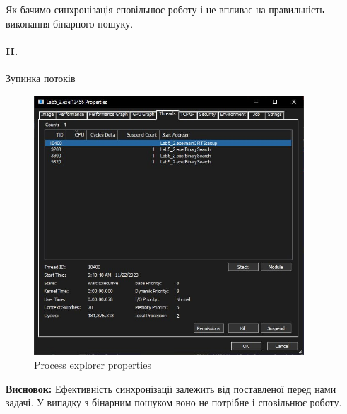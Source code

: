 \documentclass[12pt]{extarticle}
\begin{document}
Як бачимо синхронізація сповільнює роботу і не впливає на правильність виконання бінарного пошуку.


\break

\paragraph{II.} Зупинка потоків
\begin{figure}[H]
    \centering
    \includegraphics[width=0.90\textwidth]{threads.jpg}
    \caption{Process explorer properties}
\end{figure}
\textbf{Висновок:}
Ефективність синхронізації залежить від поставленої перед нами задачі. У
випадку з бінарним пошуком воно не потрібне і сповільнює роботу.
 
\end{document}

